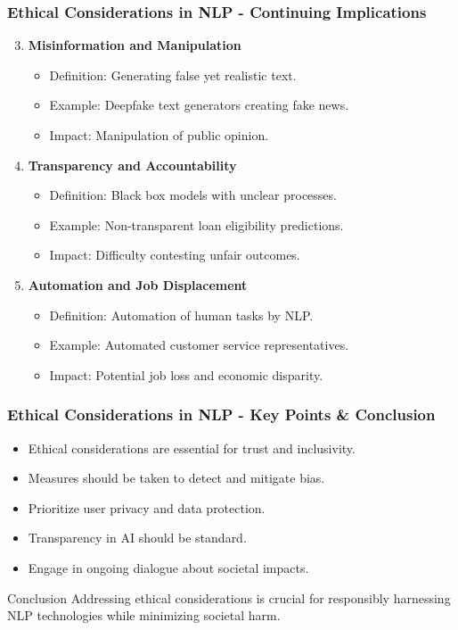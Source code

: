 \documentclass{beamer}
\begin{document}
\begin{frame}[fragile]
    \frametitle{Ethical Considerations in NLP - Continuing Implications}
    \begin{enumerate}
        \setcounter{enumi}{2}
        \item \textbf{Misinformation and Manipulation}
            \begin{itemize}
                \item Definition: Generating false yet realistic text.
                \item Example: Deepfake text generators creating fake news.
                \item Impact: Manipulation of public opinion.
            \end{itemize}

        \item \textbf{Transparency and Accountability}
            \begin{itemize}
                \item Definition: Black box models with unclear processes.
                \item Example: Non-transparent loan eligibility predictions.
                \item Impact: Difficulty contesting unfair outcomes.
            \end{itemize}

        \item \textbf{Automation and Job Displacement}
            \begin{itemize}
                \item Definition: Automation of human tasks by NLP.
                \item Example: Automated customer service representatives.
                \item Impact: Potential job loss and economic disparity.
            \end{itemize}
    \end{enumerate}
\end{frame}

\begin{frame}[fragile]
    \frametitle{Ethical Considerations in NLP - Key Points & Conclusion}
    \begin{itemize}
        \item Ethical considerations are essential for trust and inclusivity.
        \item Measures should be taken to detect and mitigate bias.
        \item Prioritize user privacy and data protection.
        \item Transparency in AI should be standard.
        \item Engage in ongoing dialogue about societal impacts.
    \end{itemize}
    
    \begin{block}{Conclusion}
        Addressing ethical considerations is crucial for responsibly harnessing NLP technologies while minimizing societal harm.
    \end{block}
\end{frame}
\end{document}
